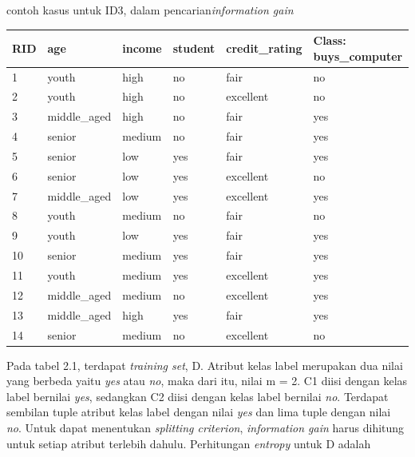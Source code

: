 contoh kasus untuk ID3, dalam pencarian\textsl{information gain}

\begin{table}[h]
\begin{tabular}{|l|l|l|l|l|l|}
\hline
RID & age          & income & student & credit\_rating & Class: buys\_computer \\ \hline
1   & youth        & high   & no      & fair           & no                    \\ \hline
2   & youth        & high   & no      & excellent      & no                    \\ \hline
3   & middle\_aged & high   & no      & fair           & yes                   \\ \hline
4   & senior       & medium & no      & fair           & yes                   \\ \hline
5   & senior       & low    & yes     & fair           & yes                   \\ \hline
6   & senior       & low    & yes     & excellent      & no                    \\ \hline
7   & middle\_aged & low    & yes     & excellent      & yes                   \\ \hline
8   & youth        & medium & no      & fair           & no                    \\ \hline
9   & youth        & low    & yes     & fair           & yes                   \\ \hline
10  & senior       & medium & yes     & fair           & yes                   \\ \hline
11  & youth        & medium & yes     & excellent      & yes                   \\ \hline
12  & middle\_aged & medium & no      & excellent      & yes                   \\ \hline
13  & middle\_aged & high   & yes     & fair           & yes                   \\ \hline
14  & senior       & medium & no      & excellent      & no                    \\ \hline
\end{tabular}
\end{table}

Pada tabel 2.1, terdapat \textsl{training set}, D. Atribut kelas label merupakan dua nilai yang berbeda yaitu \textsl{yes} atau \textsl{no}, maka dari itu, nilai m = 2. C1 diisi dengan kelas label bernilai \textsl{yes}, sedangkan C2 diisi dengan kelas label bernilai \textsl{no}. Terdapat sembilan tuple atribut kelas label dengan nilai \textsl{yes} dan lima tuple dengan nilai \textsl{no}. Untuk dapat menentukan \textsl{splitting criterion}, \textsl{information gain} harus dihitung untuk setiap atribut terlebih dahulu. Perhitungan \textsl{entropy} untuk D adalah

